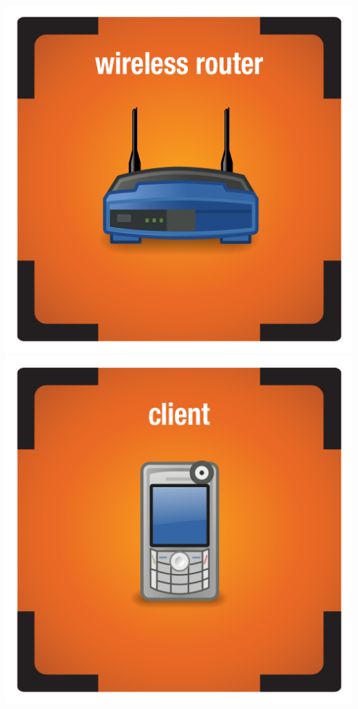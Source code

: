 \documentclass{letter}
\begin{document}
\includegraphics{tiles/node_wireless_router_compromised}
\includegraphics{tiles/node_client_mobile_compromised} \\
\end{document}
